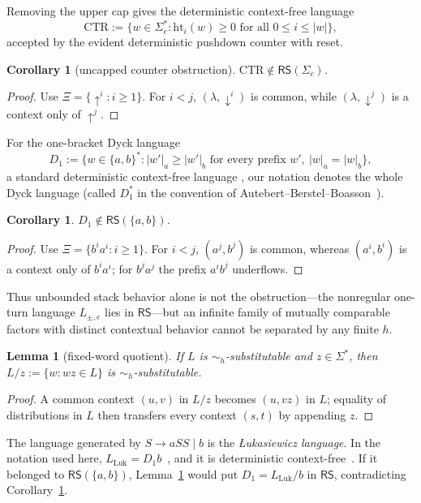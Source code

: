 \documentclass[11pt,a4paper]{article}
\newtheorem{lemma}[theorem]{Lemma}
\newtheorem{corollary}[theorem]{Corollary}
\theoremstyle{remark}
\theoremstyle{plain}
\begin{document}
Removing the upper cap gives the deterministic context-free language
\[
\mathrm{CTR}:=
\{w\in\Sigma_c^*: \mathrm{ht}_i(w)\ge0
\text{ for all }0\le i\le|w|\},
\]
accepted by the evident deterministic pushdown counter with reset.

\begin{corollary}[uncapped counter obstruction]
$\mathrm{CTR}\notin\mathsf{RS}(\Sigma_c)$.
\end{corollary}
\begin{proof}
Use $\Xi=\{\uparrow^i:i\ge1\}$.  For $i<j$,
$(\lambda,\downarrow^i)$ is common, while
$(\lambda,\downarrow^j)$ is a context only of $\uparrow^j$.
\end{proof}

For the one-bracket Dyck language
\[
 D_1:=\{w\in\{a,b\}^*: |w'|_a\ge|w'|_b
 \text{ for every prefix }w',\ |w|_a=|w|_b\},
\]
a standard deterministic context-free language
\cite{ginsburg-greibach1966}, our notation denotes the whole Dyck language
(called $D_1^*$ in the convention of
Autebert--Berstel--Boasson~\cite{autebert1997}).

\begin{corollary}\label{cor:dyck-not-rs}
$D_1\notin\mathsf{RS}(\{a,b\})$.
\end{corollary}
\begin{proof}
Use $\Xi=\{b^ia^i:i\ge1\}$.  For $i<j$,
$(a^j,b^j)$ is common, whereas $(a^i,b^i)$ is a context only of
$b^ia^i$; for $b^ja^j$ the prefix $a^ib^j$ underflows.
\end{proof}

Thus unbounded stack behavior alone is not the obstruction---the nonregular
one-turn language $L_{\pm,e}$ lies in $\mathsf{RS}$---but an infinite
family of mutually comparable factors with distinct contextual behavior
cannot be separated by any finite $h$.

\begin{lemma}[fixed-word quotient]\label{lem:rs-fixed-quotient}
If $L$ is $\sim_h$-substitutable and $z\in\Sigma^*$, then
$L/z:=\{w:wz\in L\}$ is $\sim_h$-substitutable.
\end{lemma}
\begin{proof}
A common context $(u,v)$ in $L/z$ becomes $(u,vz)$ in $L$; equality of
distributions in $L$ then transfers every context $(s,t)$ by appending $z$.
\end{proof}

The language generated by $S\to aSS\mid b$ is the
\emph{{\selectfont\L{}}ukasiewicz language}.  In the notation used here,
$L_{\mathrm{Luk}}=D_1b$~\cite{autebert1997}, and it is deterministic
context-free~\cite{ginsburg-greibach1966}.  If it belonged to
$\mathsf{RS}(\{a,b\})$, Lemma~\ref{lem:rs-fixed-quotient} would put
$D_1=L_{\mathrm{Luk}}/b$ in $\mathsf{RS}$, contradicting
Corollary~\ref{cor:dyck-not-rs}.
\end{document}

